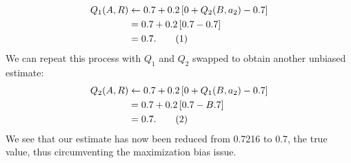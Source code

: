 \documentclass{article}
\newcommand\numberthis{\addtocounter{equation}{1}\tag{\theequation}}
\begin{document}
\begin{enumerate}
\begin{align*}
		      Q_1(A, R) & \leftarrow 0.7 + 0.2 \left[ 0 + Q_2(B, a_2) - 0.7\right] \\
		                & = 0.7 + 0.2 \left[ 0.7 - 0.7\right]                      \\
		                & = 0.7. \numberthis
	      \end{align*}
	      We can repeat this process with $Q_1$ and $Q_2$ swapped to obtain another unbiased estimate:
	      \begin{align*}
		      Q_2(A, R) & \leftarrow 0.7 + 0.2 \left[ 0 + Q_1(B, a_2) - 0.7\right] \\
		                & = 0.7 + 0.2 \left[ 0.7 - B.7\right]                      \\
		                & = 0.7. \numberthis
	      \end{align*}
	      We see that our estimate has now been reduced from 0.7216 to 0.7, the true value, thus
	      circumventing the maximization bias issue.
\end{enumerate}
\end{document}
